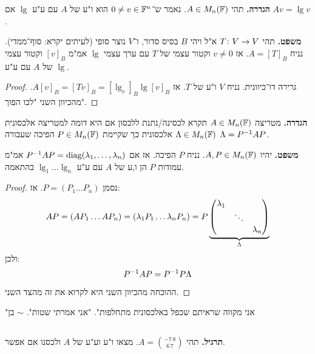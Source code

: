 \documentclass[]{../../../../tex/classes/styledArticle}
\begin{document}
	\section{}
	\textbf{הגדרה. }תהי $A \in M_n(\mathbb{F})$. נאמר ש־$0 \neq v \in \mathbb{F}^n$ הוא ו"ע של $A$ עם ע"ע $\lg$ אם $Av = \lg v$. 
	
	\textbf{משפט. }תהי $T \colon V \to V$ א"ל ויהי $B$ בסיס סדור, ו־$V$ נוצר סופי (לעיתים יקרא: סוף־ממדי). נניח $A = [T]_B$. אז $v \neq 0$ וקטור עצמי של $T$ עם ערך עצמי $\lg$ אמ"מ $[v]_B$ וקטור עצמי של $A$ עם ע"ע $\lg$. 
	
	\begin{proof}
		גרירה דו־כיוונית. 
		נניח $V$ ו"ע של $T$. אז $A[v]_B = [Tv]_B = [\lg_v]_B \lg[v]_B$. מהכיוון השני "לכו הפוך". 
	\end{proof}
	
	\textbf{הגדרה. }מטריצה $A \in M_n(\mathbb{F})$ תקרא לכסינה/נתנת ללכסון אם היא דומה למטריצה אלכסונית $\Lambda \in M_n(\mathbb{F})$ אלכסונית כך שקיימת $P \in M_n(\mathbb{F})$ הפיכה שעבורה $\Lambda = P^{-1} AP$. 
	
	\textbf{משפט. }יהיו $A, P \in M_n(\mathbb{F})$. נניח $P$ הפיכה. אז אם $P^{-1} AP = \operatorname{diag}(\lambda_1, \dots, \lambda_n)$ אמ"מ עמודות $P$ הן ו,ע של $A$ עם ע"ע $\lg_1 \dots \lg_n$ בהתאמה. 
	
	\begin{proof}
		נסמן $P = (P_1 \dots P_n)$. אז: 
		\[ AP = (AP_1 \dots AP_n) = (\lambda_1P_1 \dots \lambda_nP_n) = P\underbrace{\begin{pmatrix} \lambda_1 && \\ & \ddots & \\ && \lambda_n \end{pmatrix}}_{\Lambda} \]
		ולכן: 
		\[ P^{-1} AP = P^{-1} P\Lambda \]
		ההוכחה מהכיוון השני היא לקרוא את זה מהצד השני. 
	\end{proof}
	
	"אני מקווה שראיתם שכפל באלכסונית מתחלפות". 
	"אני אמרתי שטות". 
	$\sim$ בן 
	
	\subsection{}
	\textbf{תרגיל. }תהי $A = \binom{-7 \, 8}{6 \, 7}$. מצאו ו"ע וע"ע של $A$ ולכסנו אם אפשר. 
	
\end{document}
